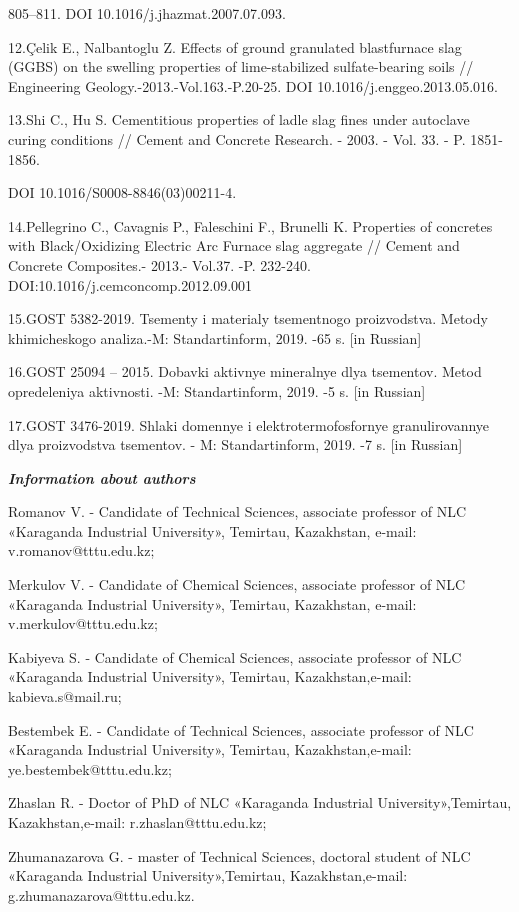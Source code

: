805--811. DOI 10.1016/j.jhazmat.2007.07.093.

12.Çelik E., Nalbantoglu Z. Effects of ground granulated blastfurnace
slag (GGBS) on the swelling properties of lime-stabilized
sulfate-bearing soils // Engineering Geology.-2013.-Vol.163.-P.20-25.
DOI 10.1016/j.enggeo.2013.05.016.

13.Shi C., Hu S. Cementitious properties of ladle slag fines under
autoclave curing conditions // Cement and Concrete Research. - 2003. -
Vol. 33. - P. 1851-1856.

DOI 10.1016/S0008-8846(03)00211-4.

14.Pellegrino C., Cavagnis P., Faleschini F., Brunelli K. Properties of
concretes with Black/Oxidizing Electric Arc Furnace slag aggregate //
Cement and Concrete Composites.- 2013.- Vol.37. -P. 232-240.
DOI:10.1016/j.cemconcomp.2012.09.001

15.GOST 5382-2019. Tsementy i materialy tsementnogo proizvodstva. Metody
khimicheskogo analiza.-M: Standartinform, 2019. -65 s. {[}in Russian{]}

16.GOST 25094 -- 2015. Dobavki aktivnye mineral\textquotesingle nye dlya
tsementov. Metod opredeleniya aktivnosti. -M: Standartinform, 2019. -5
s. {[}in Russian{]}

17.GOST 3476-2019. Shlaki domennye i elektrotermofosfornye
granulirovannye dlya proizvodstva tsementov. - M: Standartinform, 2019.
-7 s. {[}in Russian{]}

\emph{\textbf{Information about authors}}

Romanov V. - Candidate of Technical Sciences, associate professor of NLC
«Karaganda Industrial University», Temirtau, Kazakhstan, e-mail:
v.romanov@tttu.edu.kz;

Merkulov V. - Candidate of Chemical Sciences, associate professor of NLC
«Karaganda Industrial University», Temirtau, Kazakhstan, e-mail:
v.merkulov@tttu.edu.kz;

Kabiyeva S. - Candidate of Chemical Sciences, associate professor of NLC
«Karaganda Industrial University», Temirtau, Kazakhstan,e-mail:
kabieva.s@mail.ru;

Bestembek E. - Candidate of Technical Sciences, associate professor of
NLC «Karaganda Industrial University», Temirtau, Kazakhstan,e-mail:
ye.bestembek@tttu.edu.kz;

Zhaslan R. - Doctor of PhD of NLC «Karaganda Industrial
University»,Temirtau, Kazakhstan,e-mail: r.zhaslan@tttu.edu.kz;

Zhumanazarova G. - master of Technical Sciences, doctoral student of NLC
«Karaganda Industrial University»,Temirtau, Kazakhstan,e-mail:
g.zhumanazarova@tttu.edu.kz.

